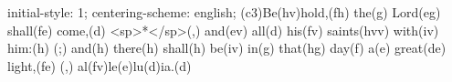 initial-style: 1;
centering-scheme: english;
(c3)Be(hv)hold,(fh) the(g) Lord(eg) shall(fe) come,(d) <sp>*</sp>(,) and(ev) all(d) his(fv) saints(hvv) with(iv) him:(h) (;) and(h) there(h) shall(h) be(iv) in(g) that(hg) day(f) a(e) great(de) light,(fe) (,) al(fv)le(e)lu(d)ia.(d)
